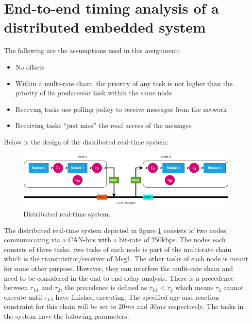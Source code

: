 \section*{End-to-end timing analysis of a distributed embedded system}

    The following are the assumptions used in this assignment:

    \begin{itemize}
        \item No offsets
        \item Within a multi-rate chain, the priority of any task is not higher than the priority of its
        predecessor task within the same node
        \item Receving tasks use polling policy to receive messages from the network
        \item Receiving tasks “just miss” the read access of the messages
    \end{itemize}


    Below is the design of the distributed real-time system:

    \begin{figure}[H]
        \centering
        \includegraphics[width=1\textwidth]{images/design.png}
        \caption{Distributed real-time system.}
        \label{fig:design}
    \end{figure}

    The distributed real-time system depicted in figure \ref{fig:design} consists of two nodes, communicating via a CAN-bus with a bit-rate of 250kbps. The nodes each consists of three tasks, two tasks of each node is part of the multi-rate chain which is the transmisttor/receiver of Msg1. The other tasks of each node is meant for some other purpose. However, they can interfere the multi-rate chain and need to be considered in the end-to-end delay analysis. There is a precedence between $\tau_{IA}$ and $\tau_2$, the precedence is defined as $\tau_{IA} < \tau_2$ which means $\tau_2$ cannot execute until $\tau_{IA}$ have finished executing. The specified age and reaction constraint for this chain will be set to $20ms$ and $30ms$ respectively. The tasks in the system have the following parameters:

